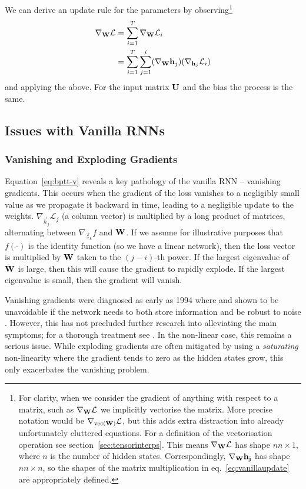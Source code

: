 We can derive an update rule for the parameters by observing\footnote{For clarity, when we
consider the gradient of anything with respect to a matrix, such as \(\nabla_{\mathbf{W}}\mathcal{L}\)
we implicitly vectorise the matrix. More precise notation would be
\(\nabla_{\operatorname{vec}(\mathbf{W})}\mathcal{L}\), but this adds extra distraction into already unfortunately
 cluttered equations. For a definition of the vectorisation operation see 
section~\ref{sec:tensorinterps}. This means \(\nabla_{\mathbf{W}}\mathcal{L}\) has shape \(nn \times 1\),
where \(n\) is the number of hidden states. Correspondingly, \(\nabla_{\mathbf{W}}\mathbf{h_j}\) has
shape \(nn \times n\), so the shapes of the matrix multiplication in eq.~\eqref{eq:vanillaupdate}
are appropriately defined.
}
\begin{align}
	\nabla_{\mathbf{W}} \mathcal{L} &= \sum_{i=1}^T \nabla_{\mathbf{W}} \mathcal{L}_i \\
	&= \sum_{i=1}^T\sum_{j=1}^i(\nabla_{\mathbf{W}} \mathbf{h}_j)(\nabla_{\mathbf{h}_j} \mathcal{L}_i )
	\label{eq:vanillaupdate}
\end{align} 
and applying the above. For the input matrix \(\mathbf{U}\) and the bias the process is the same.

\subsection{Issues with Vanilla RNNs}
\subsubsection{Vanishing and Exploding Gradients}
Equation~\eqref{eq:bptt-v} reveals a key pathology of the vanilla RNN -- vanishing gradients.
This occurs when the gradient of the loss vanishes to a negligibly small value as we
propagate it backward in time, leading to a negligible update to the weights.
 \(\nabla_{\vec{h}_j}\mathcal{L}_j\) (a column vector) is multiplied by a long product of
 matrices, alternating between \(\nabla_{\vec{z}_k} f\) and \(\mathbf{W}\). If we assume for
 illustrative purposes that \(f(\cdot)\) is the identity function (so we have a linear network),
then the loss vector is multiplied by \(\mathbf{W}\) taken to the \((j-i)\)-th power. If the largest
eigenvalue of \(\mathbf{W}\) is large, then this will cause the gradient to rapidly explode.
If the largest eigenvalue is small, then the gradient will vanish. 

Vanishing gradients were diagnosed
as early as 1994 where and shown to be unavoidable if the network needs to both store
information and be robust to noise \autocite{Bengio1994}. 
However, this has not precluded further research into alleviating
the main symptoms; for a thorough treatment see \autocite{Pascanu2012}.
In the non-linear case, this remains a serious issue. While exploding gradients are often
mitigated by using a \emph{saturating} non-linearity where the gradient tends to zero as the
hidden states grow, this only exacerbates the vanishing problem. 


